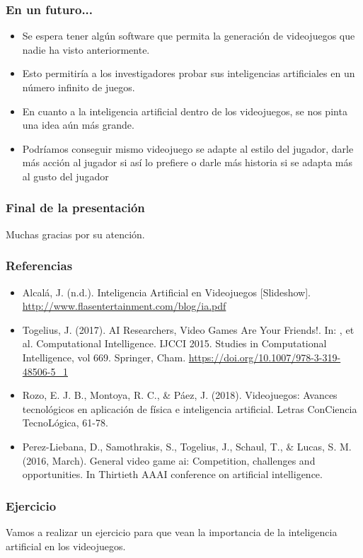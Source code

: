 \documentclass[aspectratio=169]{beamer}
\begin{document}
\begin{frame}
\frametitle{En un futuro...}
\begin{itemize}[<+->]
\item Se espera tener algún software que permita la generación de videojuegos
  que nadie ha visto anteriormente.
\item Esto permitiría a los investigadores probar sus inteligencias artificiales
  en un número infinito de juegos.
\item En cuanto a la inteligencia artificial dentro de los videojuegos, se nos
  pinta una idea aún más grande.
\item Podríamos conseguir mismo videojuego se adapte al estilo del jugador,
  darle más acción al jugador si así lo prefiere o darle más historia si se adapta
  más al gusto del jugador
\end{itemize}
\end{frame}


\begin{frame}
\frametitle{Final de la presentación}

Muchas gracias por su atención.
\end{frame}

\begin{frame}
\frametitle{Referencias}
\begin{itemize}
\item Alcalá, J. (n.d.). Inteligencia Artificial en Videojuegos [Slideshow]. 
\url{http://www.flasentertainment.com/blog/ia.pdf}
\item Togelius, J. (2017). AI Researchers, Video Games Are Your Friends!. In: , et al. 
Computational Intelligence. IJCCI 2015. Studies in Computational Intelligence, vol 669. 
Springer, Cham. \url{https://doi.org/10.1007/978-3-319-48506-5\_1} 
\item Rozo, E. J. B., Montoya, R. C., \& Páez, J. (2018). Videojuegos: Avances tecnológicos en 
aplicación de física e inteligencia artificial. Letras ConCiencia TecnoLógica, 61-78.
\item Perez-Liebana, D., Samothrakis, S., Togelius, J., Schaul, T., \& Lucas, S. M. 
(2016, March). General video game ai: Competition, challenges and opportunities. 
In Thirtieth AAAI conference on artificial intelligence.
\end{itemize}
\end{frame}

\begin{frame}
\frametitle{Ejercicio}

\begin{center}
Vamos a realizar un ejercicio para que vean la importancia de la inteligencia
artificial en los videojuegos.
\end{center}
\end{frame}
\end{document}
